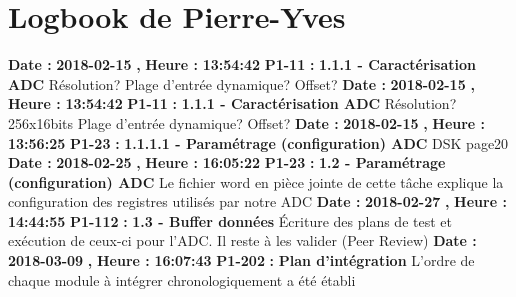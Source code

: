 \documentclass{article}%
\begin{document}
%
\section{Logbook de Pierre{-}Yves}%
\textbf{Date : }%
\textbf{2018{-}02{-}15}%
\textbf{,}%
\textbf{ Heure : }%
\textbf{13:54:42}%
\newline%
%
\textbf{P1{-}11 }%
\textbf{ : }%
\textbf{ 1.1.1 {-} Caractérisation ADC}%
\newline%
\newline%
%
Résolution?\newline%
Plage d'entrée dynamique?\newline%
Offset?\newline%
\newline%
%
\textbf{Date : }%
\textbf{2018{-}02{-}15}%
\textbf{,}%
\textbf{ Heure : }%
\textbf{13:54:42}%
\newline%
%
\textbf{P1{-}11 }%
\textbf{ : }%
\textbf{ 1.1.1 {-} Caractérisation ADC}%
\newline%
\newline%
%
Résolution? 256x16bits\newline%
Plage d'entrée dynamique?\newline%
Offset?\newline%
\newline%
%
\textbf{Date : }%
\textbf{2018{-}02{-}15}%
\textbf{,}%
\textbf{ Heure : }%
\textbf{13:56:25}%
\newline%
%
\textbf{P1{-}23 }%
\textbf{ : }%
\textbf{ 1.1.1.1 {-} Paramétrage (configuration) ADC}%
\newline%
\newline%
%
DSK page20\newline%
\newline%
%
\textbf{Date : }%
\textbf{2018{-}02{-}25}%
\textbf{,}%
\textbf{ Heure : }%
\textbf{16:05:22}%
\newline%
%
\textbf{P1{-}23 }%
\textbf{ : }%
\textbf{ 1.2 {-} Paramétrage (configuration) ADC}%
\newline%
\newline%
%
Le fichier word en pièce jointe de cette tâche explique la configuration des registres utilisés par notre ADC\newline%
\newline%
%
\textbf{Date : }%
\textbf{2018{-}02{-}27}%
\textbf{,}%
\textbf{ Heure : }%
\textbf{14:44:55}%
\newline%
%
\textbf{P1{-}112 }%
\textbf{ : }%
\textbf{ 1.3 {-} Buffer données}%
\newline%
\newline%
%
Écriture des plans de test et exécution de ceux{-}ci pour l'ADC. Il reste à les valider (Peer Review)\newline%
\newline%
%
\textbf{Date : }%
\textbf{2018{-}03{-}09}%
\textbf{,}%
\textbf{ Heure : }%
\textbf{16:07:43}%
\newline%
%
\textbf{P1{-}202 }%
\textbf{ : }%
\textbf{ Plan d'intégration}%
\newline%
\newline%
%
L'ordre de chaque module à intégrer chronologiquement a été établi\newline%
\newline%
%
\newpage
\end{document}
